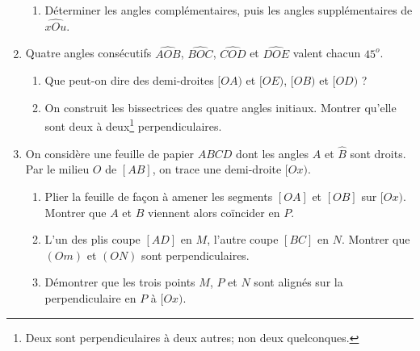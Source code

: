 \documentclass[12 pt]{report}
\theoremstyle{plain}
\newcounter{n}
\begin{document}
\begin{enumerate}
\begin{enumerate}
\item Déterminer les angles complémentaires, puis les angles supplémentaires de $\widehat{xOu}$. 
\end{enumerate}
\item Quatre angles consécutifs $\widehat{AOB}$, $\widehat{BOC}$, $\widehat{COD}$ et $\widehat{DOE}$ valent chacun $45^o$. 
\begin{enumerate}
\item Que peut-on dire des demi-droites $[OA)$ et $[OE)$, $[OB)$ et $[OD)$ ?
\item On construit les bissectrices des quatre angles initiaux. Montrer qu'elle sont deux à deux\footnote{Deux sont perpendiculaires à deux autres; non deux quelconques.} perpendiculaires. 
\end{enumerate}
\item On considère une feuille de papier $ABCD$ dont les angles $\widehat{A}$ et $\widehat{B}$ sont droits. Par le milieu $O$ de $[AB]$, on trace une demi-droite 
$[Ox)$.\begin{enumerate}
\item Plier la feuille de façon à amener les segments $[OA]$ et $[OB]$ sur $[Ox)$. 
Montrer que $A$ et $B$ viennent alors coïncider en $P$.
\item L'un des plis coupe $[AD]$ en $M$, l'autre coupe $[BC]$ en $N$. Montrer que $(Om)$ et $(ON)$ sont perpendiculaires.
\item Démontrer que les trois points $M$, $P$ et $N$ sont alignés sur la perpendiculaire en $P$ à $[Ox)$.
\end{enumerate}
\end{enumerate}
\end{document}
